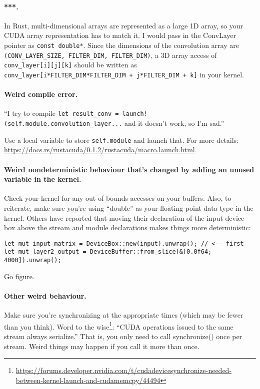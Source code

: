 \paragraph{***.} In Rust, multi-dimensional arrays are represented as a large 1D array, so your CUDA array representation has to match it. I would pass in the ConvLayer pointer as \texttt{const double*}. Since the dimensions of the convolution array are \texttt{(CONV\_LAYER\_SIZE, FILTER\_DIM, FILTER\_DIM)}, a 3D array access of \texttt{conv\_layer[i][j][k]} should be written as \texttt{conv\_layer[i*FILTER\_DIM*FILTER\_DIM + j*FILTER\_DIM + k]} in your kernel.

\paragraph{Weird compile error.} ``I try to compile \verb+let result_conv = launch!(self.module.convolution_layer...+ and it doesn't work, so I'm sad.''

Use a local variable to store \texttt{self.module} and launch that. For more details: \url{https://docs.rs/rustacuda/0.1.2/rustacuda/macro.launch.html}.

\paragraph{Weird nondeterministic behaviour that's changed by adding an unused variable in the kernel.} Check your kernel for any out of bounds accesses on your buffers. Also, to reiterate, make sure you're using ``double'' as your floating point data type in the kernel. Others have reported that moving their declaration of the input device box above the stream and module declarations makes things more deterministic:
\begin{verbatim}
let mut input_matrix = DeviceBox::new(input).unwrap(); // <-- first
let mut layer2_output = DeviceBuffer::from_slice(&[0.0f64; 4000]).unwrap();
\end{verbatim}
Go figure.

\paragraph{Other weird behaviour.} Make sure you're synchronizing at the appropriate times (which may be fewer than you think). Word to the wise\footnote{\url{https://forums.developer.nvidia.com/t/cudadevicesynchronize-needed-between-kernel-launch-and-cudamemcpy/44494}}: ``CUDA operations issued to the same stream always serialize.'' That is, you only need to call synchronize() once per stream. Weird things may happen if you call it more than once.

